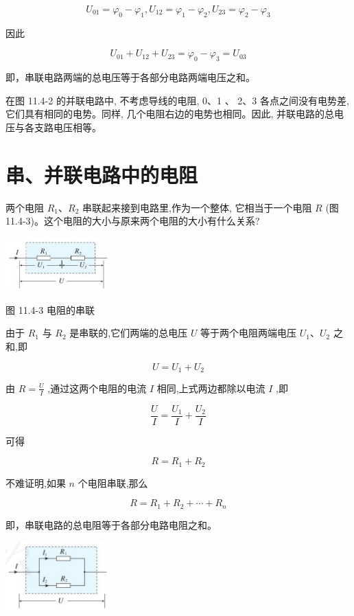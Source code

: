 \documentclass[10pt]{article}
\begin{document}
\[
{U}_{01} = {\varphi }_{0} - {\varphi }_{1},{U}_{12} = {\varphi }_{1} - {\varphi }_{2},{U}_{23} = {\varphi }_{2} - {\varphi }_{3}
\]

因此

\[
{U}_{01} + {U}_{12} + {U}_{23} = {\varphi }_{0} - {\varphi }_{3} = {U}_{03}
\]

即，串联电路两端的总电压等于各部分电路两端电压之和。

在图 11.4-2 的并联电路中, 不考虑导线的电阻, 0、1 、 2、3 各点之间没有电势差, 它们具有相同的电势。同样, 几个电阻右边的电势也相同。因此, 并联电路的总电压与各支路电压相等。

\section*{串、并联电路中的电阻}

两个电阻 \({R}_{1}\text{、}{R}_{2}\) 串联起来接到电路里,作为一个整体, 它相当于一个电阻 \(R\) (图 11.4-3)。这个电阻的大小与原来两个电阻的大小有什么关系?

\begin{center}
\includegraphics[max width=0.3\textwidth]{images/01911d5f-8e38-70c0-b5b8-2b399bd115b6_74_623536.jpg}
\end{center}

图 11.4-3 电阻的串联

由于 \({R}_{1}\) 与 \({R}_{2}\) 是串联的,它们两端的总电压 \(U\) 等于两个电阻两端电压 \({U}_{1}\text{、}{U}_{2}\) 之和,即

\[
U = {U}_{1} + {U}_{2}
\]

由 \(R = \frac{U}{I}\) ,通过这两个电阻的电流 \(I\) 相同,上式两边都除以电流 \(I\) ,即

\[
\frac{U}{I} = \frac{{U}_{1}}{I} + \frac{{U}_{2}}{I}
\]

可得

\[
R = {R}_{1} + {R}_{2} \tag{1}
\]

不难证明,如果 \(n\) 个电阻串联,那么

\[
R = {R}_{1} + {R}_{2} + \cdots + {R}_{n}
\]

即，串联电路的总电阻等于各部分电路电阻之和。

\begin{center}
\includegraphics[max width=0.3\textwidth]{images/01911d5f-8e38-70c0-b5b8-2b399bd115b6_74_492194.jpg}
\end{center}
\end{document}

